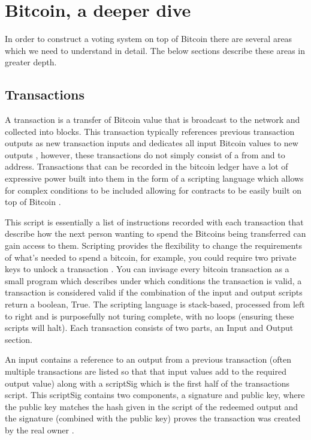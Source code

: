 \documentclass{article}
\begin{document}
    \section{Bitcoin, a deeper dive}
    In order to construct a voting system on top of Bitcoin there are several areas which we need to understand in detail. The below sections describe these areas in greater depth.
    
    \subsection{Transactions}
   
A transaction is a transfer of Bitcoin value that is broadcast to the network and collected into blocks. This transaction typically references previous transaction outputs as new transaction inputs and dedicates all input Bitcoin values to new outputs \citep{30_transactions_-_bitcoin_wiki_2016}, however, these transactions do not simply consist of a from and to address. Transactions that can be recorded in the bitcoin ledger have a lot of expressive power built into them in the form of a scripting language which allows for complex conditions to be included allowing for contracts to be easily built on top of Bitcoin \citep{29_wenger_2013}.

This script is essentially a list of instructions recorded with each transaction that describe how the next person wanting to spend the Bitcoins being transferred can gain access to them. Scripting provides the flexibility to change the requirements of what's needed to spend a bitcoin, for example, you could require two private keys to unlock a transaction \citep{31_script_-_bitcoin_wiki_2016}. You can invisage every bitcoin transaction as a small program which describes under which conditions the transaction is valid, a transaction is considered valid if the combination of the input and output scripts return a boolean, True. The scripting language is stack-based, processed from left to right and is purposefully not turing complete, with no loops (ensuring these scripts will halt). Each transaction consists of two parts, an Input and Output section.

An input contains a reference to an output from a previous transaction (often multiple transactions are listed so that that input values add to the required output value) along with a scriptSig which is the first half of the transactions script. This scriptSig contains two components, a signature and public key, where the public key matches the hash given in the script of the redeemed output and the signature (combined with the public key) proves the transaction was created by the real owner \citep{30_transactions_-_bitcoin_wiki_2016}.
\end{document}
